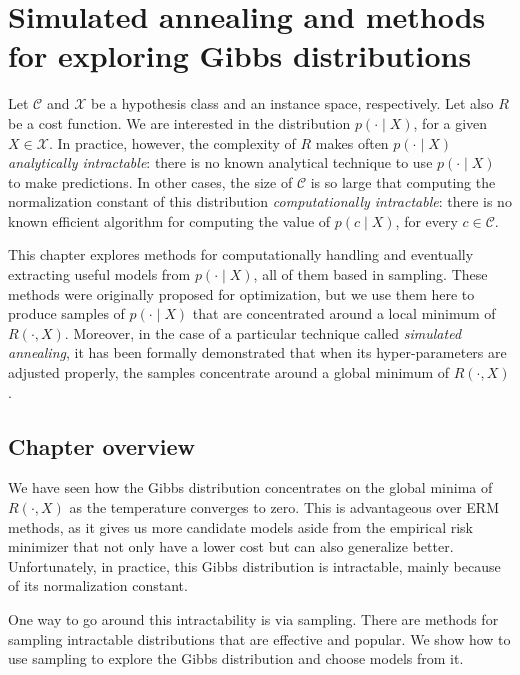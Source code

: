 \chapter{Simulated annealing and methods for exploring Gibbs distributions}

Let $\mathcal{C}$ and $\mathcal{X}$ be a hypothesis class and an instance space, respectively. Let
also $R$ be a cost function. We are interested in the distribution $p(\cdot \mid X)$,
for a given $X \in \mathcal{X}$. In practice, however, the complexity of $R$ makes often
$p(\cdot \mid X)$ \emph{analytically intractable}: there is no known analytical technique to
use $p(\cdot \mid X)$ to make predictions. In other cases, the size of $\mathcal{C}$ is so large that
computing the normalization constant of this distribution \emph{computationally
intractable}: there is no known efficient algorithm for computing the value
of $p(c \mid X)$, for every $c \in \mathcal{C}$.

This chapter explores methods for computationally handling and eventually
extracting useful models from $p(\cdot \mid X)$, all of them based in sampling.
These methods were originally proposed for optimization, but we use them
here to produce samples of $p(\cdot \mid X)$ that are concentrated around a local
minimum of $R(\cdot, X)$. Moreover, in the case of a particular technique called \emph{simulated annealing}, it has
been formally demonstrated that when its hyper-parameters are adjusted
properly, the samples concentrate around a global minimum of $R(\cdot, X)$.

\section{Chapter overview}

We have seen how the Gibbs distribution concentrates on the global minima
of $R(\cdot, X)$ as the temperature converges to zero. This is advantageous over
ERM methods, as it gives us more candidate models aside from the empirical
risk minimizer that not only have a lower cost but can also generalize
better. Unfortunately, in practice, this Gibbs distribution is intractable,
mainly because of its normalization constant.

One way to go around this intractability is via sampling. There are
methods for sampling intractable distributions that are effective and popular.
We show how to use sampling to explore the Gibbs distribution and
choose models from it.

